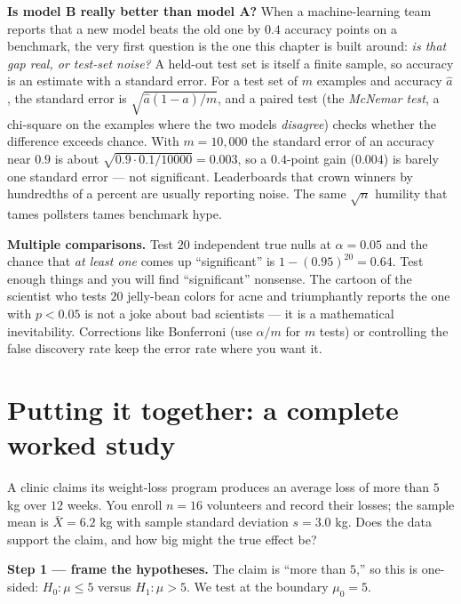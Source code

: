 \begin{applicationbox}
\textbf{Is model B really better than model A?} When a machine-learning team reports
that a new model beats the old one by $0.4$ accuracy points on a benchmark, the very
first question is the one this chapter is built around: \emph{is that gap real, or test-set
noise?} A held-out test set is itself a finite sample, so accuracy is an estimate with a
standard error. For a test set of $m$ examples and accuracy $\hat a$, the standard error
is $\sqrt{\hat a(1-\hat a)/m}$, and a paired test (the \emph{McNemar test}, a chi-square
on the examples where the two models \emph{disagree}) checks whether the difference
exceeds chance. With $m=10{,}000$ the standard error of an accuracy near $0.9$ is about
$\sqrt{0.9\cdot 0.1/10000}=0.003$, so a $0.4$-point gain ($0.004$) is barely one standard
error --- not significant. Leaderboards that crown winners by hundredths of a percent are
usually reporting noise. The same $\sqrt n$ humility that tames pollsters tames
benchmark hype.
\end{applicationbox}

\begin{trapbox}
\textbf{Multiple comparisons.} Test $20$ independent true nulls at $\alpha=0.05$ and the
chance that \emph{at least one} comes up ``significant'' is $1-(0.95)^{20}=0.64$. Test
enough things and you will find ``significant'' nonsense. The cartoon of the scientist
who tests $20$ jelly-bean colors for acne and triumphantly reports the one with $p<0.05$
is not a joke about bad scientists --- it is a mathematical inevitability. Corrections
like Bonferroni (use $\alpha/m$ for $m$ tests) or controlling the false discovery rate
keep the error rate where you want it.
\end{trapbox}

\section{Putting it together: a complete worked study}
\label{ch32:worked}

\begin{walkbox}
A clinic claims its weight-loss program produces an average loss of more than $5$ kg
over $12$ weeks. You enroll $n=16$ volunteers and record their losses; the sample mean
is $\bar X = 6.2$ kg with sample standard deviation $s = 3.0$ kg. Does the data support
the claim, and how big might the true effect be?
\end{walkbox}

\textbf{Step 1 --- frame the hypotheses.} The claim is ``more than $5$,'' so this is
one-sided: $H_0\!:\mu \le 5$ versus $H_1\!:\mu > 5$. We test at the boundary $\mu_0=5$.

